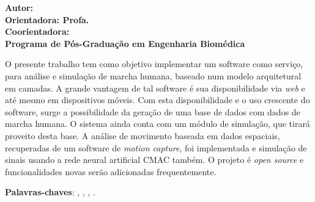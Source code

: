 \begin{resumo}

\begin{center}
\textbf{\imprimirtitulo}
\end{center}

\begin{flushleft}
\footnotesize
\textbf{Autor: \imprimirautor }\\
\textbf{Orientadora: Profa. \imprimirorientador }\\
\textbf{Coorientadora: \imprimirmembroCoorientador} \\
\textbf{Programa de Pós-Graduação em Engenharia Biomédica} \\
\textbf{\imprimirlocal \imprimirdata }
\end{flushleft}

O presente trabalho tem como objetivo implementar um software como serviço, para análise e simulação de marcha humana, baseado num modelo arquitetural em camadas. 
A grande vantagem de tal software é sua disponibilidade via \emph{web} e até mesmo em dispositivos móveis. 
Com esta disponibilidade e o uso crescente do software, surge a possibilidade da geração de uma base de dados com dados de marcha humana. 
O sistema ainda conta com um módulo de simulação, que tirará proveito desta base. 
A análise de movimento baseada em dados espaciais, recuperadas de um software de \emph{motion capture}, foi implementada e simulação de sinais usando a rede neural artificial CMAC também.
O projeto é \emph{open source} e funcionalidades novas serão adicionadas frequentemente.  

\vspace{\onelineskip}
    
 \noindent
 \textbf{Palavras-chaves}: \imprimirpalavrachaveum, \imprimirpalavrachavedois, 
			    \imprimirpalavrachavetres, \imprimirpalavrachavequatro.
\end{resumo}

